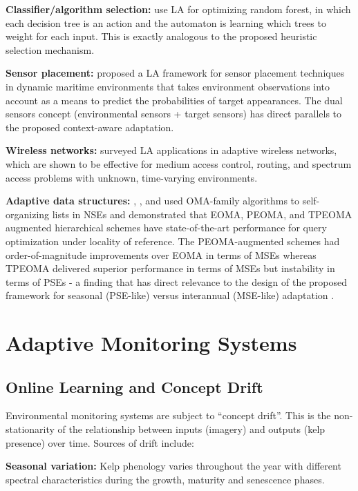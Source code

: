 \documentclass[12pt,oneside]{book}
\begin{document}
\textbf{Classifier/algorithm selection:} \citet{Savargiv2021} use LA for optimizing random forest, in which each decision tree is an action and the automaton is learning which trees to weight for each input. This is exactly analogous to the proposed heuristic selection mechanism.

\textbf{Sensor placement:} \citet{BenZvi2018} proposed a LA framework for sensor placement techniques in dynamic maritime environments that takes environment observations into account as a means to predict the probabilities of target appearances. The dual sensors concept (environmental sensors + target sensors) has direct parallels to the proposed context-aware adaptation.

\textbf{Wireless networks:} \citet{Nicopolitidis2011} surveyed LA applications in adaptive wireless networks, which are shown to be effective for medium access control, routing, and spectrum access problems with unknown, time-varying environments.

\textbf{Adaptive data structures:} \citet{Bisong2018}, \citet{BisongOommen2020a}, and \citet{BisongOommen2021} used OMA-family algorithms to self-organizing lists in NSEs and demonstrated that EOMA, PEOMA, and TPEOMA augmented hierarchical schemes have state-of-the-art performance for query optimization under locality of reference. The PEOMA-augmented schemes had order-of-magnitude improvements over EOMA in terms of MSEs \citep{BisongOommen2019a} whereas TPEOMA delivered superior performance in terms of MSEs but instability in terms of PSEs - a finding that has direct relevance to the design of the proposed framework for seasonal (PSE-like) versus interannual (MSE-like) adaptation \citep{BisongOommen2020b, BisongOommen2021}.

\section{Adaptive Monitoring Systems}
\label{sec:lit-adaptive}

\subsection{Online Learning and Concept Drift}
\label{subsec:online-learning}

Environmental monitoring systems are subject to ``concept drift''. This is the non-stationarity of the relationship between inputs (imagery) and outputs (kelp presence) over time. Sources of drift include:

\textbf{Seasonal variation:} Kelp phenology varies throughout the year with different spectral characteristics during the growth, maturity and senescence phases.
\end{document}
